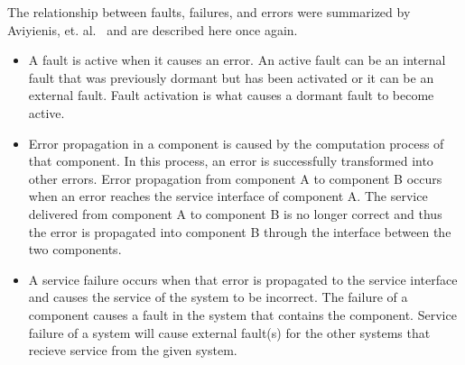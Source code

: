The relationship between faults, failures, and errors were summarized by Aviyienis, et. al.~\cite{basicConcepts} and are described here once again.%

\begin{itemize}
\item A fault is active when it causes an error. An active fault can be an internal fault that was previously dormant but has been activated or it can be an external fault. Fault activation is what causes a dormant fault to become active. 

\item Error propagation in a component is caused by the computation process of that component. In this process, an error is successfully transformed into other errors. Error propagation from component A to component B occurs when an error reaches the service interface of component A. The service delivered from component A to component B is no longer correct and thus the error is propagated into component B through the interface between the two components.

\item A service failure occurs when that error is propagated to the service interface and causes the service of the system to be incorrect. The failure of a component causes a fault in the system that contains the component. Service failure of a system will cause external fault(s) for the other systems that recieve service from the given system. 
\end{itemize}